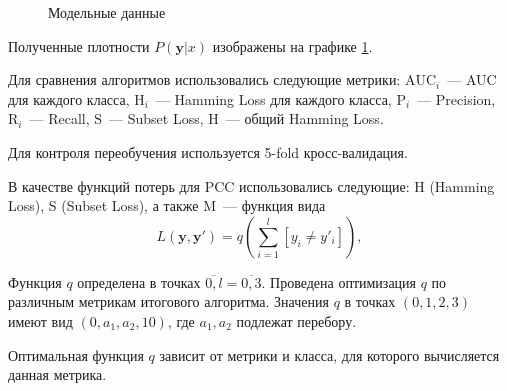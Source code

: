 \documentclass[12pt,twoside]{article}
\newcommand{\y}{\mathbf{y}}
\begin{document}

\begin{figure}[h]
	\caption{Модельные данные}
	\label{fg:ModelData}
\end{figure}

Полученные плотности $P(\y|x)$ изображены на графике \ref{fg:ModelData}.

Для сравнения алгоритмов использовались следующие метрики: $\mbox{AUC}_i$~--- AUC для каждого класса, $\mbox{H}_i$~--- Hamming Loss для каждого класса, $\mbox{P}_i$~--- Precision, $\mbox{R}_i$~--- Recall, $\mbox{S}$~--- Subset Loss, $\mbox{H}$~--- общий Hamming Loss.

Для контроля переобучения используется 5-fold кросс-валидация.

В качестве функций потерь для PCC использовались следующие: H (Hamming Loss), S (Subset Loss), а также M~--- функция вида
$$L(\y,\y')=q\left(\sum\limits_{i=1}^l[y_i\neq y'_i]\right),$$

Функция $q$ определена в точках $\overline{0,l}=\overline{0,3}$. Проведена оптимизация $q$ по различным метрикам итогового алгоритма. Значения $q$ в точках $(0,1,2,3)$ имеют вид $(0,a_1,a_2,10)$, где $a_1,a_2$ подлежат перебору.

Оптимальная функция $q$ зависит от метрики и класса, для которого вычисляется данная метрика.
\end{document}
